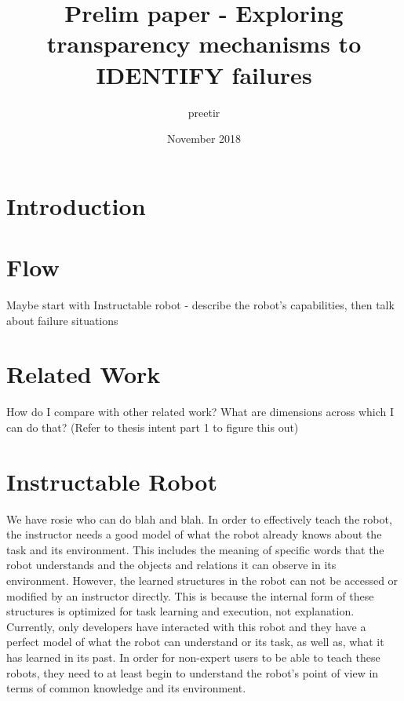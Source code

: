 \documentclass[letterpaper]{article}
\title{Prelim paper - Exploring transparency mechanisms to IDENTIFY failures}
\author{preetir }
\date{November 2018}
\begin{document}
\maketitle

\section{Introduction}

\section{Flow}
Maybe start with Instructable robot - describe the robot's capabilities, then talk about failure situations 
\section{Related Work}
How do I compare with other related work? What are dimensions across which I can do that? (Refer to thesis intent part 1 to figure this out)

\section{Instructable Robot}
We have rosie who can do blah and blah.
In order to effectively teach the robot, the instructor needs a good model of what the robot already knows about the task and its environment. This includes the meaning of specific words that the robot understands and the objects and relations it can observe in its environment. However, the learned structures in the robot can not be accessed or modified by an instructor directly. This is because the internal form of these structures is optimized for task learning and execution, not explanation. Currently, only developers have interacted with this robot and they have a perfect model of what the robot can understand or its task, as well as, what it has learned in its past. In order for non-expert users to be able to teach these robots, they need to at least begin to understand the robot's point of view in terms of common knowledge and its environment.
\end{document}
